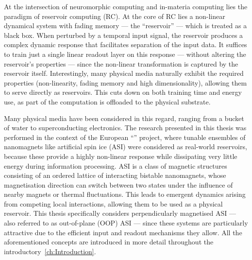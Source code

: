 At the intersection of neuromorphic computing and in-materia computing lies the paradigm of reservoir computing (RC).
At the core of RC lies a non-linear dynamical system with fading memory --- the ``reservoir'' --- which is treated as a black box.
When perturbed by a temporal input signal, the reservoir produces a complex dynamic response that facilitates separation of the input data.
It suffices to train just a single linear readout layer on this response --- without altering the reservoir's properties --- since the non-linear transformation is captured by the reservoir itself.
Interestingly, many physical media naturally exhibit the required properties (non-linearity, fading memory and high dimensionality), allowing them to serve directly as reservoirs.
This cuts down on both training time and energy use, as part of the computation is offloaded to the physical substrate. \par
Many physical media have been considered in this regard, ranging from a bucket of water to superconducting electronics. %
The research presented in this thesis was performed in the context of the European ``\spinengine'' project, where tunable ensembles of nanomagnets like artificial spin ice (ASI) were considered as real-world reservoirs, because these provide a highly non-linear response while dissipating very little energy during information processing.
ASI is a class of magnetic structures consisting of an ordered lattice of interacting bistable nanomagnets, whose magnetisation direction can switch between two states under the influence of nearby magnets or thermal fluctuations.
This leads to emergent dynamics arising from competing local interactions, allowing them to be used as a physical reservoir.
This thesis specifically considers perpendicularly magnetised ASI --- also referred to as out-of-plane (OOP) ASI --- since these systems are particularly attractive due to the efficient input and readout mechanisms they allow.
All the aforementioned concepts are introduced in more detail throughout the introductory~\cref{ch:Introduction}. \\

